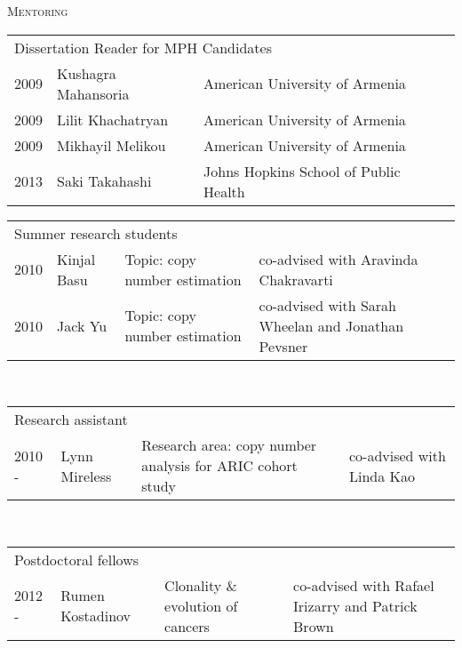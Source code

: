 \documentclass[11pt]{article}%
\begin{document}
{\vspace{4pt}

\noindent\textsc{Mentoring}

\vspace{2pt}

\begin{tabular}{llll}
\multicolumn{3}{l}{Dissertation Reader for MPH Candidates}\\
2009 & Kushagra Mahansoria & American University of
Armenia\\
2009 & Lilit Khachatryan & American University of
Armenia\\
2009 & Mikhayil Melikou & American University of
Armenia\\
2013 & Saki Takahashi &  Johns Hopkins School of Public Health
\end{tabular}

\vspace{3pt}


\begin{tabular}{llll}
  \multicolumn{4}{l}{Summer research students}\\
  2010 & Kinjal Basu  & Topic: copy number estimation & co-advised with Aravinda Chakravarti\\
  2010 & Jack Yu      & Topic: copy number estimation &co-advised with Sarah Wheelan and Jonathan Pevsner\\
\end{tabular}\\

\vspace{3pt}

\begin{tabular}{llll}
  \multicolumn{4}{l}{Research assistant}\\
 2010 -  & Lynn Mireless & Research area: copy number analysis for ARIC cohort study &
 co-advised with Linda Kao\\
\end{tabular}\\

\begin{tabular}{llll}
  \multicolumn{4}{l}{Postdoctoral fellows}\\
  2012 -  & Rumen Kostadinov& Clonality \& evolution of cancers &
  co-advised with Rafael Irizarry and Patrick Brown\\
\end{tabular}\\


}
\end{document}
